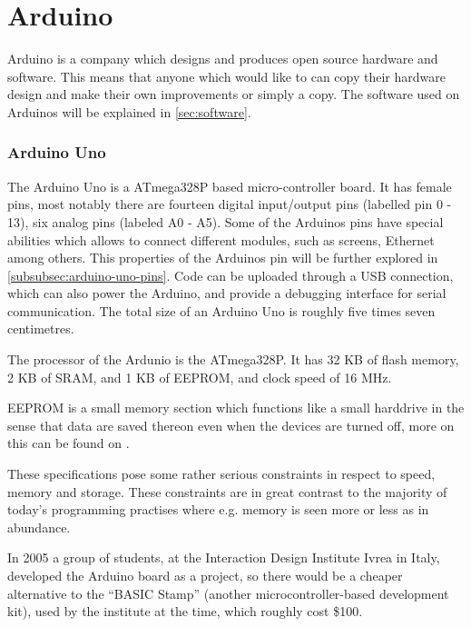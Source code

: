 
\section{Arduino}
Arduino is a company which designs and produces open source hardware and software.
This means that anyone which would like to can copy their hardware design and make their own improvements or simply a copy.
The software used on Arduinos will be explained in \ref{sec:software}.

\subsubsection{Arduino Uno}
The Arduino Uno is a ATmega328P based micro-controller board.
It has female pins, most notably there are fourteen digital input/output pins (labelled pin 0 - 13), six analog pins (labeled A0 - A5).
Some of the Arduinos pins have special abilities which allows to connect different modules, such as screens, Ethernet among others.
This properties of the Arduinos pin will be further explored in \ref{subsubsec:arduino-uno-pins}.
Code can be uploaded through a USB connection, which can also power the Arduino, and provide a debugging interface for serial communication.
The total size of an Arduino Uno is roughly five times seven centimetres. 

The processor of the Ardunio is the ATmega328P.
It has 32 KB of flash memory, 2 KB of SRAM, and 1 KB of EEPROM, and clock speed of 16 MHz.

EEPROM is a small memory section which functions like a small harddrive in the sense that data are saved thereon even when the devices are turned off, more on this can be found on \cite{EEPROM}.

These specifications pose some rather serious constraints in respect to speed, memory and storage.
These constraints are in great contrast to the majority of today's programming practises where e.g. memory is seen more or less as in abundance.


\begin{tcolorbox}[floatplacement=b,float,colback=white!5,colframe=aaublue!50,title=The Birth of the Arduino \cite{birthofarduino}.]
In 2005 a group of students, at the Interaction Design Institute Ivrea in Italy, developed the Arduino board as a project, so there would be a cheaper alternative to the ``BASIC Stamp'' (another microcontroller-based development kit), used by the institute at the time, which roughly cost \$100.
\end{tcolorbox}

